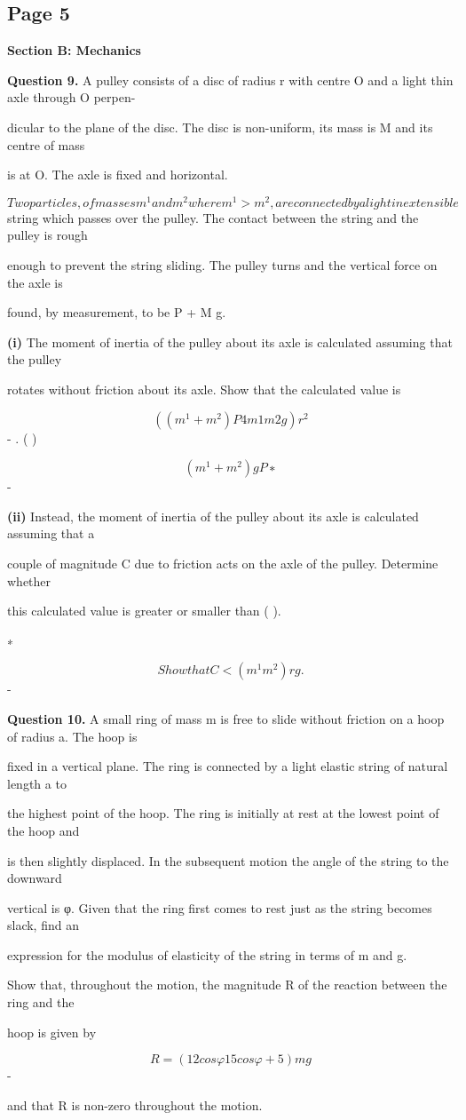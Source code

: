 \documentclass[12pt]{article}
\begin{document}
\subsection*{Page 5}
\begin{flushleft}
\bigskip\textbf{Section B: Mechanics}\par
\bigskip\textbf{Question 9.} A pulley consists of a disc of radius r with centre O and a light thin axle through O perpen-\par
dicular to the plane of the disc. The disc is non-uniform, its mass is M and its centre of mass\par
is at O. The axle is fixed and horizontal.\par
\[Two particles, of masses m^1 and m^2 where m^1 > m^2, are connected by a light inextensible\]
string which passes over the pulley. The contact between the string and the pulley is rough\par
enough to prevent the string sliding. The pulley turns and the vertical force on the axle is\par
found, by measurement, to be P + M g.\par
\textbf{(i)} The moment of inertia of the pulley about its axle is calculated assuming that the pulley\par
rotates without friction about its axle. Show that the calculated value is\par
\[((m^1 + m^2)P 4m1m2g)r^2\]
- . ( )\par
\[(m^1 + m^2)g P ∗\]
-\par
\textbf{(ii)} Instead, the moment of inertia of the pulley about its axle is calculated assuming that a\par
couple of magnitude C due to friction acts on the axle of the pulley. Determine whether\par
this calculated value is greater or smaller than ( ).\par
∗\par
\[Show that C < (m^1 m^2)rg.\]
-\par
\bigskip\textbf{Question 10.} A small ring of mass m is free to slide without friction on a hoop of radius a. The hoop is\par
fixed in a vertical plane. The ring is connected by a light elastic string of natural length a to\par
the highest point of the hoop. The ring is initially at rest at the lowest point of the hoop and\par
is then slightly displaced. In the subsequent motion the angle of the string to the downward\par
vertical is φ. Given that the ring first comes to rest just as the string becomes slack, find an\par
expression for the modulus of elasticity of the string in terms of m and g.\par
Show that, throughout the motion, the magnitude R of the reaction between the ring and the\par
hoop is given by\par
\[R = (12 cos φ 15 cos φ + 5)mg\]
-\par
and that R is non-zero throughout the motion.\par
\end{flushleft}
\end{document}
